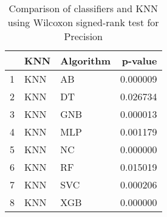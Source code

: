 \begin{table}
\footnotesize
\caption{Comparison of classifiers and KNN using Wilcoxon signed-rank test for Precision}
\label{tab:KNN wilcoxon Precision comparison}
\begin{tabular}{lllr}
\hline
 & KNN & Algorithm & p-value \\
\hline
1 & KNN & AB & 0.000009 \\
2 & KNN & DT & 0.026734 \\
3 & KNN & GNB & 0.000013 \\
4 & KNN & MLP & 0.001179 \\
5 & KNN & NC & 0.000000 \\
6 & KNN & RF & 0.015019 \\
7 & KNN & SVC & 0.000206 \\
8 & KNN & XGB & 0.000000 \\
\hline
\end{tabular}
\end{table}
